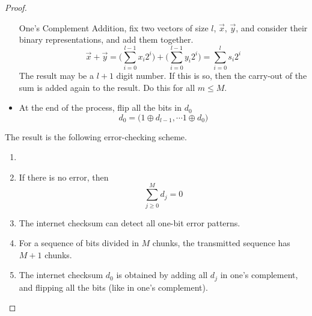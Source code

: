 \documentclass[../../main.tex]{subfiles}
\begin{document}
\begin{proof}
\begin{definition}
\begin{itemize}
        One's Complement Addition, fix two vectors of size $l$, $\vec{x}$, $\vec{y}$, and consider their binary representations, and add them together.
        \[
        \vec{x} + \vec{y} = \biggl(\sum_{i=0}^{l-1} x_i 2^i\biggr) + \biggl(\sum_{i=0}^{l-1} y_i 2^i\biggr) = \sum_{i=0}^{l} s_i 2^i
        \]
        The result may be a $l+1$ digit number. If this is so, then the carry-out of the sum is added again to the result. Do this for all $m\leq M$.\\
        \item At the end of the process, flip all the bits in $d_0$
        \[
        d_0 = \biggl(1\oplus d_{l-1},\cdots 1\oplus d_{0}\biggr)
        \]
    \end{itemize}
\end{definition}
    The result is the following error-checking scheme.
\begin{wtr}
\begin{enumerate}
        \item[]
        \item If there is no error, then
        \[
        \boxed{\sum_{j\geq 0}^M d_j=0}
        \]
        \item The internet checksum can detect all one-bit error patterns.
        \item For a sequence of bits divided in $M$ chunks, the transmitted sequence has $M+1$ chunks.
        \item The internet checksum $d_0$ is obtained by adding all $d_j$ in one's complement, and flipping all the bits (like in one's complement).
    \end{enumerate}
\end{wtr}    
\end{proof}
\end{document}
